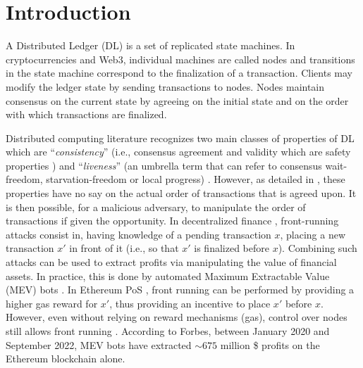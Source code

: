 

\section{Introduction}


A Distributed Ledger (DL) is a set of replicated state machines. 
In cryptocurrencies and Web3, individual machines are called nodes and transitions in the state machine correspond to the finalization
of a transaction.
Clients may modify the ledger state by sending transactions to nodes.
Nodes maintain consensus on the current state by agreeing on the initial state and on the order with which transactions are finalized.


Distributed computing literature recognizes two main classes of properties of DL which are ``\textit{consistency}'' (i.e., consensus agreement and validity which are safety properties \cite{recognizing_safety_and_liveness}) and ``\textit{liveness}'' (an umbrella term that can refer to consensus wait-freedom, starvation-freedom or local progress) \cite{safety_liveness_exclusion_in_distributed_computing}.
However, as detailed in \cite{order_fairness_for_byzantine_consensus}, these properties have no say on the actual order of transactions that is agreed upon.
It is then possible, for a malicious adversary, to manipulate the order of transactions if given the opportunity.
In decentralized finance \cite{sok_preventing_transaction_reordering_manipulations_in_decentralized_finance}, front-running attacks \cite{flash_boys_frontrunning_in_decentralized_exchanges_miner_extractable_value_and_consensus_instability} consist in, having knowledge of a pending transaction $x$, placing a new transaction $x'$ in front of it (i.e., so that $x'$ is finalized before $x$).
Combining such attacks can be used to extract profits via manipulating the value of financial assets.
In practice, this is done by automated Maximum Extractable Value (MEV) bots \cite{flash_boys_frontrunning_in_decentralized_exchanges_miner_extractable_value_and_consensus_instability,sok_preventing_transaction_reordering_manipulations_in_decentralized_finance}. 
In Ethereum PoS \cite{exploiting_ethereum_after_the_merge_the_interplay_between_pos_and_mev_strategies}, front running can be performed by providing a higher gas reward for $x'$, thus providing an incentive to place $x'$ before $x$.
However, even without relying on reward mechanisms (gas), control over nodes still allows front running \cite{adversary_augmented_simulation_to_evaluate_client_fairness_on_hyperledger_fabric}.
According to Forbes, between January 2020 and September 2022, MEV bots have extracted $\sim675$ million \$ profits on the Ethereum blockchain alone.





